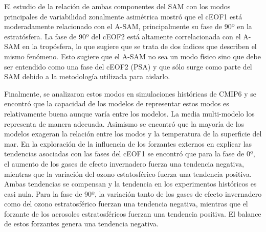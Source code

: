 \documentclass[12pt,oneside,a4paper]{reedthesis}
\begin{document}
\begin{resumen}
    El estudio de la relación de ambas componentes del SAM con los modos principales de variabilidad zonalmente asimétrica mostró que el cEOF1 está moderadamente relacionado con el A-SAM, principalmente su fase de 90º en la estratósfera.
    La fase de 90º del cEOF2 está altamente correlacionada con el A-SAM en la tropósfera, lo que sugiere que se trata de dos índices que describen el mismo fenómeno.
    Esto sugiere que el A-SAM no sea un modo físico sino que debe ser entendido como una fase del cEOF2 (PSA) y que sólo surge como parte del SAM debido a la metodología utilizada para aislarlo.

    Finalmente, se analizaron estos modos en simulaciones históricas de CMIP6 y se encontró que la capacidad de los modelos de representar estos modos es relativamente buena aunque varía entre los modelos.
    La media multi-modelo los representa de manera adecuada.
    Asimismo se encontró que la mayoría de los modelos exageran la relación entre los modos y la temperatura de la superficie del mar.
    En la exploración de la influencia de los forzantes externos en explicar las tendencias asociadas con las fases del cEOF1 se encontró que para la fase de 0º, el aumento de los gases de efecto invernadero fuerza una tendencia negativa, mientras que la variación del ozono estatosférico fuerza una tendencia positiva.
    Ambas tendencias se compensan y la tendencia en los experimentos históricos es casi nula.
    Para la fase de 90º, la variación tanto de los gases de efecto invernadero como del ozono estratosférico fuerzan una tendencia negativa, mientras que el forzante de los aerosoles estratosféricos fuerzan una tendencia positiva.
    El balance de estos forzantes genera una tendencia negativa.
  \end{resumen}
\end{document}
